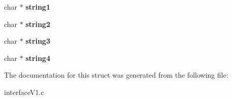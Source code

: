 \begin{DoxyCompactItemize}
char $\ast$ {\bfseries string1}
\item 
\mbox{\label{struct_minha_janela_afb8689c6def831672d102654b94f14a1}} 
char $\ast$ {\bfseries string2}
\item 
\mbox{\label{struct_minha_janela_a37c242fdfd6d44096944f692006fd4d6}} 
char $\ast$ {\bfseries string3}
\item 
\mbox{\label{struct_minha_janela_ab90f501029d80eb65bce43fa828ff1cf}} 
char $\ast$ {\bfseries string4}
\end{DoxyCompactItemize}


The documentation for this struct was generated from the following file\+:\begin{DoxyCompactItemize}
\item 
interface\+V1.\+c\end{DoxyCompactItemize}
